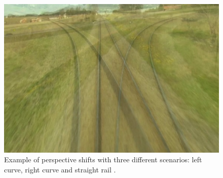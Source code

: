 \begin{figure}[H]
    \centering
    \includegraphics[width=\linewidth]{PICs/Baselinepaper/perspective_shifts.jpg}
    \caption{Example of perspective shifts with three different scenarios: left curve, right curve and straight rail \cite{tepNet2024}.}
    \label{fig:perspective_shifts}
\end{figure}